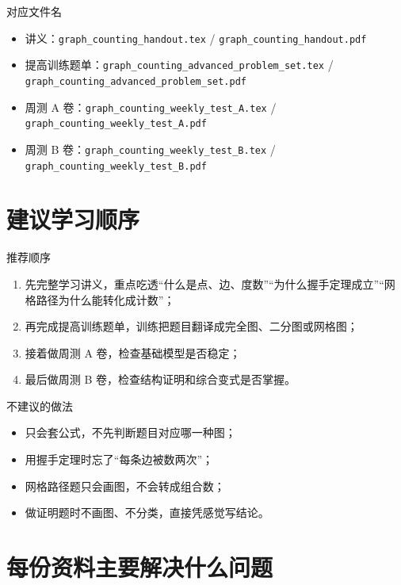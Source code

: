 \documentclass[11pt,a4paper,fontset=fandol]{ctexart}
\begin{document}
\begin{infobox}{对应文件名}
\begin{itemize}
  \item 讲义：\texttt{graph\_counting\_handout.tex} / \texttt{graph\_counting\_handout.pdf}
  \item 提高训练题单：\texttt{graph\_counting\_advanced\_problem\_set.tex} / \texttt{graph\_counting\_advanced\_problem\_set.pdf}
  \item 周测 A 卷：\texttt{graph\_counting\_weekly\_test\_A.tex} / \texttt{graph\_counting\_weekly\_test\_A.pdf}
  \item 周测 B 卷：\texttt{graph\_counting\_weekly\_test\_B.tex} / \texttt{graph\_counting\_weekly\_test\_B.pdf}
\end{itemize}
\end{infobox}

\section{建议学习顺序}

\begin{goalbox}{推荐顺序}
\begin{enumerate}
  \item 先完整学习讲义，重点吃透“什么是点、边、度数”“为什么握手定理成立”“网格路径为什么能转化成计数”；
  \item 再完成提高训练题单，训练把题目翻译成完全图、二分图或网格图；
  \item 接着做周测 A 卷，检查基础模型是否稳定；
  \item 最后做周测 B 卷，检查结构证明和综合变式是否掌握。
\end{enumerate}
\end{goalbox}

\begin{warnbox}{不建议的做法}
\begin{itemize}
  \item 只会套公式，不先判断题目对应哪一种图；
  \item 用握手定理时忘了“每条边被数两次”；
  \item 网格路径题只会画图，不会转成组合数；
  \item 做证明题时不画图、不分类，直接凭感觉写结论。
\end{itemize}
\end{warnbox}

\section{每份资料主要解决什么问题}
\end{document}
